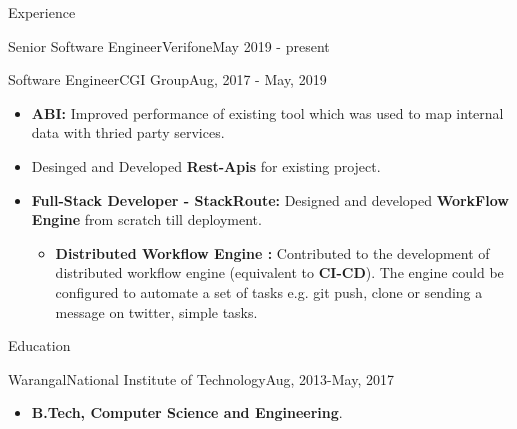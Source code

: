 \documentclass[]{twentysecondcv}
\begin{document}
\begin{cvsection}{Experience}
\begin{cvsubsection}{Senior Software Engineer}{Verifone}{May 2019 - present}
\begin{itemize}
	\end{itemize}
	\end{cvsubsection}
	\begin{cvsubsection}{Software Engineer}{CGI Group}{Aug, 2017 - May, 2019}
		\begin{itemize}%
		\item \textbf{ABI:} Improved performance of existing tool which was used to map internal data with thried party services.
		\item Desinged and 	Developed \textbf{Rest-Apis} for existing project.
		\item \textbf{Full-Stack Developer - StackRoute: } Designed and developed  \textbf{WorkFlow Engine} from scratch till deployment. 
			\begin{itemize}%
			\item \textbf{Distributed Workflow Engine : }Contributed to the development of distributed workflow engine (equivalent 
to \textbf{CI-CD}). The engine could be configured to automate a set of tasks 
e.g. git push, clone or sending a message on twitter, simple tasks.
	\end{itemize}
		
		\end{itemize}
	\end{cvsubsection}
\end{cvsection}
\begin{cvsection}{Education}
	\begin{cvsubsection}{Warangal}{National Institute of Technology}{Aug, 2013-May, 2017}
		\begin{itemize}
			\item \textbf{B.Tech, Computer Science and Engineering}.
		\end{itemize}
	\end{cvsubsection}
\end{cvsection}
\end{document}
